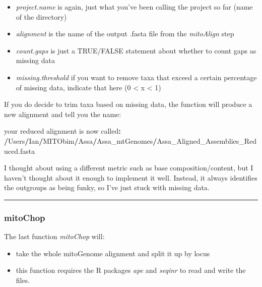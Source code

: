 \documentclass[
]{article}
\newenvironment{Shaded}{\begin{snugshade}}{\end{snugshade}}
\newcommand{\ErrorTok}[1]{\textcolor[rgb]{0.64,0.00,0.00}{\textbf{#1}}}
\newcommand{\NormalTok}[1]{#1}
\newcommand{\OperatorTok}[1]{\textcolor[rgb]{0.81,0.36,0.00}{\textbf{#1}}}
\providecommand{\tightlist}{%
  \setlength{\itemsep}{0pt}\setlength{\parskip}{0pt}}
\begin{document}
\begin{itemize}
\tightlist
\item
  \emph{project.name} is again, just what you've been calling the
  project so far (name of the directory)\\
\item
  \emph{alignment} is the name of the output .fasta file from the
  \emph{mitoAlign} step\\
\item
  \emph{count.gaps} is just a TRUE/FALSE statement about whether to
  count gaps as missing data\\
\item
  \emph{missing.threshold} if you want to remove taxa that exceed a
  certain percentage of missing data, indicate that here (0 \textless{}
  x \textless{} 1)
\end{itemize}

If you do decide to trim taxa based on missing data, the function will
produce a new alignment and tell you the name:

\begin{Shaded}
\begin{Highlighting}[]
\NormalTok{your reduced alignment is now called}\OperatorTok{:}
\ErrorTok{/}\NormalTok{Users}\OperatorTok{/}\NormalTok{Ian}\OperatorTok{/}\NormalTok{MITObim}\OperatorTok{/}\NormalTok{Assa}\OperatorTok{/}\NormalTok{Assa\_mtGenomes}\OperatorTok{/}\NormalTok{Assa\_Aligned\_Assemblies\_Reduced.fasta}
\end{Highlighting}
\end{Shaded}

I thought about using a different metric such as base
composition/content, but I haven't thought about it enough to implement
it well. Instead, it always identifies the outgroups as being funky, so
I've just stuck with missing data.

\begin{center}\rule{0.5\linewidth}{0.5pt}\end{center}

\hypertarget{mitochop}{%
\subsubsection{mitoChop}\label{mitochop}}

The last function \emph{mitoChop} will:

\begin{itemize}
\tightlist
\item
  take the whole mitoGenome alignment and split it up by locus\\
\item
  this function requires the R packages \emph{ape} and \emph{seqinr} to
  read and write the files.
\end{itemize}
\end{document}
